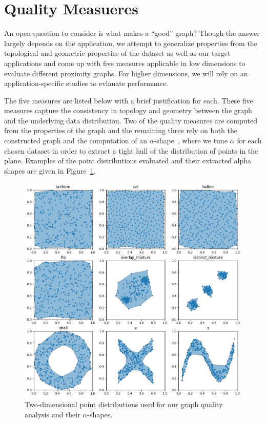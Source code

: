 \section{Quality Measueres}
\label{sec:graph_quality_measures}
An open question to consider is what makes a ``good'' graph?
%
Though the answer largely depends on the application, we attempt to generalize properties from the topological and geometric properties of the dataset as well as our target applications and come up with five measures applicable in low dimensions to evaluate different proximity graphs.
%
For higher dimensions, we will rely on an application-specific studies to evlauate performance.

The five measures are listed below with a brief justification for each.
%
These five measures capture the consistency in topology and geometry between the graph and the underlying data distribution.
%
Two of the quality measures are computed from the properties of the graph and the remaining three rely on both the constructed graph and the computation of an $\alpha$-shape~\cite{EdelsbrunnerKirkpatrickSeidel1983}, where we tune $\alpha$ for each chosen dataset in order to extract a tight hull of the distribution of points in the plane.
%
Examples of the point distributions evaluated and their extracted alpha shapes are given in Figure~\ref{fig:shapes}.

\begin{figure}[htbp]
    \includegraphics[width=\linewidth]{figs/chap7/sample_shapes.png}
    \caption{Two-dimensional point distributions used for our graph quality analysis and their $\alpha$-shapes.}
    \label{fig:shapes}
\end{figure}

